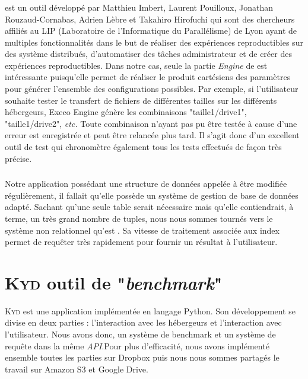 \documentclass[10pt]{article}
\newcommand{\KYD}{\textsc{Kyd}\xspace}
\begin{document}
\subsubsection{\Execo \Engine}

\Execo est un outil développé par Matthieu Imbert, Laurent Pouilloux, Jonathan Rouzaud-Cornabas, Adrien Lèbre et Takahiro Hirofuchi qui sont des chercheurs affiliés au LIP (Laboratoire de l'Informatique du Parallélisme)  de Lyon ayant de
multiples fonctionnalités dans le but de réaliser des expériences reproductibles sur des système distribués, d'automatiser des tâches administrateur et de créer des expériences reproductibles. Dans notre cas, seule la partie \textit{Engine} de
\Execo est intéressante puisqu'elle permet de réaliser le produit cartésiens des paramètres pour générer l'ensemble des configurations possibles. Par exemple, si l'utilisateur souhaite tester le
transfert de fichiers de différentes tailles sur les différents
hébergeurs, Execo Engine génère les combinaisons "taille1/drive1",
"taille1/drive2", \textit{etc.} Toute combinaison n'ayant pas pu être testée
à cause d'une erreur est enregistrée et peut être relancée plus
tard. Il s'agit donc d'un excellent outil de test qui chronomètre
également tous les tests effectués de façon très précise.

\subsubsection{\MongoDB}

Notre application possédant une structure de données appelée à être modifiée
régulièrement, il fallait qu'elle possède un système de gestion de base de
données adapté. Sachant qu'une seule table serait nécessaire mais qu'elle
contiendrait, à terme, un très grand nombre de tuples, nous nous sommes tournés
vers le système non relationnel qu'est \MongoDB. Sa vitesse de traitement
associée aux index permet de requêter très rapidement pour fournir un résultat à
l'utilisateur.

\section{\KYD outil de "\textit{benchmark}" }

\KYD est une application implémentée en langage Python. Son
développement se divise en deux parties : l'interaction avec les
hébergeurs et l'interaction avec l'utilisateur. Nous avons donc, un système de benchmark et un système de requête dans la même \textit{API}.Pour plus d'efficacité, nous avons implémenté ensemble toutes les parties sur
Dropbox puis nous nous sommes partagés le travail sur Amazon S3 et
Google Drive.
\end{document}
